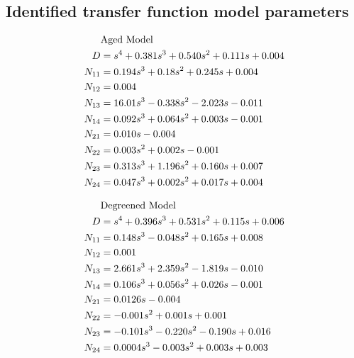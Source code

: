 \subsection*{Identified transfer function model parameters}
\begin{minipage}{0.49\textwidth}
\begin{align*}
    \footnotesize
    &\text{Aged Model}\\
    D &= s^4 + 0.381 s^3 + 0.540 s^2 + 0.111 s + 0.004\\
    N_{11} &= 0.194 s^3 + 0.18 s^2 + 0.245 s + 0.004\\
    N_{12} &= 0.004\\
    N_{13} &= 16.01 s^3 - 0.338 s^2 - 2.023 s  - 0.011\\
    N_{14} &= 0.092 s^3 + 0.064 s^2 + 0.003 s - 0.001\\
    N_{21} &=  0.010 s - 0.004\\
    N_{22} &= 0.003 s^2 + 0.002 s - 0.001\\
    N_{23} &= 0.313 s^3 + 1.196 s^2 + 0.160 s + 0.007\\
    N_{24} &= 0.047 s^3 + 0.002 s^2 + 0.017 s + 0.004
\end{align*}
\end{minipage}
\begin{minipage}{0.49\textwidth}
\begin{align*}
    \footnotesize
    &\text{Degreened Model}\\
    D &= s^4 + 0.396 s^3 + 0.531 s^2 + 0.115 s + 0.006\\
    N_{11} &= 0.148 s^3 - 0.048 s^2 + 0.165 s + 0.008\\
    N_{12} &= 0.001\\
    N_{13} &= 2.661 s^3 + 2.359 s^2 - 1.819 s - 0.010\\
    N_{14} &= 0.106 s^3 + 0.056 s^2 + 0.026 s - 0.001\\
    N_{21} &= 0.0126 s - 0.004\\
    N_{22} &= -0.001 s^2 + 0.001 s + 0.001\\
    N_{23} &= -0.101 s^3 - 0.220 s^2 - 0.190 s  + 0.016\\
    N_{24} &= 0.0004 s^3 - 0.003 s^2 + 0.003 s + 0.003
\end{align*}
\end{minipage}

